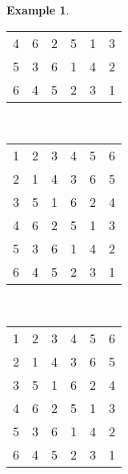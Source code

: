 \documentclass{amsart}
\theoremstyle{plain}
\theoremstyle{definition}
\newtheorem{example}[theorem]{Example}
\begin{document}
\begin{example}
\begin{center}
\begin{tabular}{@{}c@{}c@{}c@{}c@{}c@{}c@{}}
\color{lgr}4&\color{lgr}6&\color{lgr}2&\color{lgr}5&\color{lgr}1&\color{lgr}3\\
\color{lgr}5&\color{lgr}3&\color{lgr}6&\color{lgr}1&\color{lgr}4&\color{lgr}2\\
6&\color{lgr}4&\color{lgr}5&\color{lgr}2&\color{lgr}3&1\\
\end{tabular}\ \ \ \ 
\begin{tabular}{@{}c@{}c@{}c@{}c@{}c@{}c@{}}
1&\color{lgr}2&3&\color{lgr}4&\color{lgr}5&\color{lgr}6\\
\color{lgr}2&\color{lgr}1&\color{lgr}4&\color{lgr}3&\color{lgr}6&\color{lgr}5\\
3&\color{lgr}5&1&\color{lgr}6&\color{lgr}2&\color{lgr}4\\
\color{lgr}4&\color{lgr}6&\color{lgr}2&\color{lgr}5&\color{lgr}1&\color{lgr}3\\
\color{lgr}5&\color{lgr}3&\color{lgr}6&\color{lgr}1&\color{lgr}4&\color{lgr}2\\
\color{lgr}6&\color{lgr}4&\color{lgr}5&\color{lgr}2&\color{lgr}3&\color{lgr}1\\
\end{tabular}\ \ \ \ 
\begin{tabular}{@{}c@{}c@{}c@{}c@{}c@{}c@{}}
1&\color{lgr}2&\color{lgr}3&4&5&\color{lgr}6\\
\color{lgr}2&\color{lgr}1&\color{lgr}4&\color{lgr}3&\color{lgr}6&\color{lgr}5\\
\color{lgr}3&\color{lgr}5&\color{lgr}1&\color{lgr}6&\color{lgr}2&\color{lgr}4\\
4&\color{lgr}6&\color{lgr}2&5&1&\color{lgr}3\\
5&\color{lgr}3&\color{lgr}6&1&4&\color{lgr}2\\
\color{lgr}6&\color{lgr}4&\color{lgr}5&\color{lgr}2&\color{lgr}3&\color{lgr}1\\
\end{tabular}
\end{center} 
\end{example}
\end{document}
